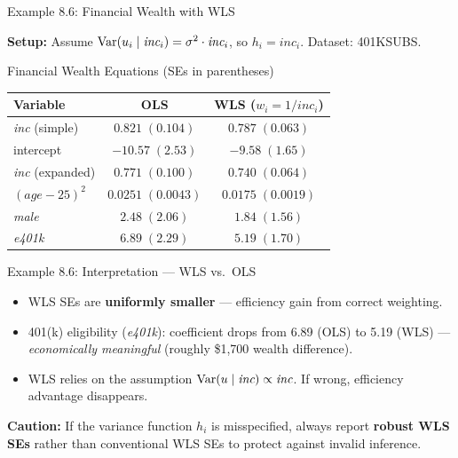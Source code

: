 \documentclass[aspectratio=169, 12pt]{beamer}
\begin{document}
\begin{frame}{Example 8.6: Financial Wealth with WLS}

  \textbf{Setup:} Assume $\operatorname{Var}(u_i \mid \textit{inc}_i) = \sigma^2 \cdot \textit{inc}_i$, so $h_i = \textit{inc}_i$. Dataset: 401KSUBS.

  \begin{examplebox}{Financial Wealth Equations (SEs in parentheses)}
    \begin{center}
      \footnotesize
      \begin{tabular}{lcc}
        \toprule
        Variable & OLS & WLS ($w_i = 1/\textit{inc}_i$) \\
        \midrule
        \textit{inc} (simple) & $0.821\;(0.104)$ & $0.787\;(0.063)$ \\
        intercept             & $-10.57\;(2.53)$ & $-9.58\;(1.65)$ \\
        \midrule
        \textit{inc} (expanded) & $0.771\;(0.100)$ & $0.740\;(0.064)$ \\
        $(\textit{age}-25)^2$   & $0.0251\;(0.0043)$ & $0.0175\;(0.0019)$ \\
        \textit{male}           & $2.48\;(2.06)$ & $1.84\;(1.56)$ \\
        \textit{e401k}          & $6.89\;(2.29)$ & $5.19\;(1.70)$ \\
        \bottomrule
      \end{tabular}
    \end{center}
  \end{examplebox}

\end{frame}

\begin{frame}{Example 8.6: Interpretation — WLS vs.\ OLS}

  \begin{keybox}
    \begin{itemize}
      \item WLS SEs are \textbf{uniformly smaller} — efficiency gain from correct weighting.
      \item 401(k) eligibility (\textit{e401k}): coefficient drops from 6.89 (OLS) to 5.19 (WLS) — \textit{economically meaningful} (roughly \$1,700 wealth difference).
      \item WLS relies on the assumption $\operatorname{Var}(u \mid \textit{inc}) \propto \textit{inc}$. If wrong, efficiency advantage disappears.
    \end{itemize}
  \end{keybox}

  \smallskip

  \begin{highlightbox}
    \textbf{Caution:} If the variance function $h_i$ is misspecified, always report \textbf{robust WLS SEs} rather than conventional WLS SEs to protect against invalid inference.
  \end{highlightbox}

\end{frame}
\end{document}
